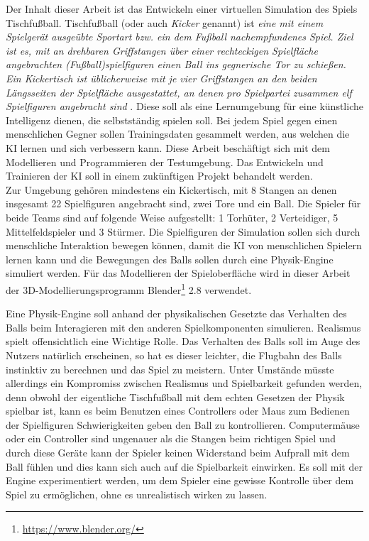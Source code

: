 Der Inhalt dieser Arbeit ist das Entwickeln einer virtuellen Simulation des Spiels Tischfußball. Tischfußball (oder auch \textit{Kicker} genannt) ist \textit{eine mit einem Spielgerät ausgeübte Sportart bzw. ein dem Fußball nachempfundenes Spiel. Ziel ist es, mit an drehbaren Griffstangen über einer rechteckigen Spielfläche angebrachten (Fußball)spielfiguren einen Ball ins gegnerische Tor zu schießen. Ein Kickertisch ist üblicherweise mit je vier Griffstangen an den beiden Längsseiten der Spielfläche ausgestattet, an denen pro Spielpartei zusammen elf Spielfiguren angebracht sind} \citep{Tischkicker}. Diese soll als eine Lernumgebung für eine künstliche Intelligenz dienen, die selbstständig spielen soll. Bei jedem Spiel gegen einen menschlichen Gegner sollen Trainingsdaten gesammelt werden, aus welchen die KI lernen und sich verbessern kann. Diese Arbeit beschäftigt sich mit dem Modellieren und Programmieren der Testumgebung. Das Entwickeln und Trainieren der KI soll in einem zukünftigen Projekt behandelt werden.\\

Zur Umgebung gehören mindestens ein Kickertisch, mit 8 Stangen an denen insgesamt 22 Spielfiguren angebracht sind, zwei Tore und ein Ball. Die Spieler für beide Teams sind auf folgende Weise aufgestellt: 1 Torhüter, 2 Verteidiger, 5 Mittelfeldspieler und 3 Stürmer. Die Spielfiguren der Simulation sollen sich durch menschliche Interaktion bewegen können, damit die KI von menschlichen Spielern lernen kann und die Bewegungen des Balls sollen durch eine Physik-Engine simuliert werden. Für das Modellieren der Spieloberfläche wird in dieser Arbeit der 3D-Modellierungsprogramm Blender\footnote{\url{https://www.blender.org/}} 2.8 verwendet.\\ 


Eine Physik-Engine soll anhand der physikalischen Gesetzte das Verhalten des Balls beim Interagieren mit den anderen Spielkomponenten simulieren. Realismus spielt offensichtlich eine Wichtige Rolle. Das Verhalten des Balls soll im Auge des Nutzers natürlich erscheinen, so hat es dieser leichter, die Flugbahn des Balls instinktiv zu berechnen und das Spiel zu meistern. Unter Umstände müsste allerdings ein Kompromiss zwischen Realismus und Spielbarkeit gefunden werden, denn obwohl der eigentliche Tischfußball mit dem echten Gesetzen der Physik spielbar ist, kann es beim Benutzen eines Controllers oder Maus zum Bedienen der Spielfiguren Schwierigkeiten geben den Ball zu kontrollieren. Computermäuse oder ein Controller sind ungenauer als die Stangen beim richtigen Spiel und durch diese Geräte kann der Spieler keinen Widerstand beim Aufprall mit dem Ball fühlen und dies kann sich auch auf die Spielbarkeit einwirken. Es soll mit der Engine experimentiert werden, um dem Spieler eine gewisse Kontrolle über dem Spiel zu ermöglichen, ohne es unrealistisch wirken zu lassen.\\

